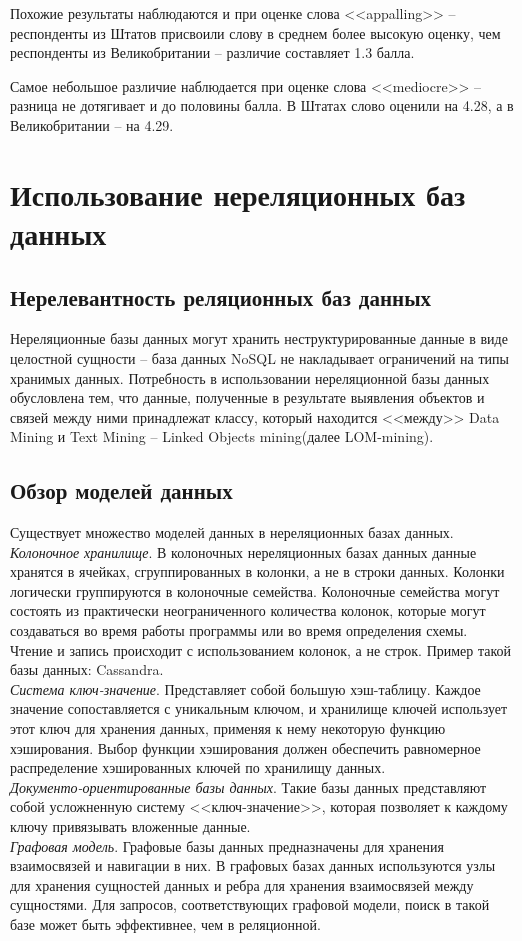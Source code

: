 Похожие результаты наблюдаются и при оценке слова <<appalling>> -- респонденты из Штатов присвоили слову в среднем более высокую оценку, чем респонденты из Великобритании -- различие составляет 1.3 балла.
 
Самое небольшое различие наблюдается при оценке слова <<mediocre>> -- разница не дотягивает и до половины балла. В Штатах слово оценили на 4.28, а в Великобритании -- на 4.29.
\section{Использование нереляционных баз данных}
\subsection{Нерелевантность реляционных баз данных}
Нереляционные базы данных могут хранить неструктурированные данные в виде целостной сущности -- база данных NoSQL не накладывает ограничений на типы хранимых данных. Потребность в использовании нереляционной базы данных обусловлена тем, что данные, полученные в результате выявления объектов и связей между ними принадлежат классу, который находится <<между>> Data Mining и Text Mining -- Linked Objects mining(далее LOM-mining). \cite{Попов2004}
\subsection{Обзор моделей данных}\label{subsec:store}
Существует множество моделей данных в нереляционных базах данных. \\
\textit{Колоночное хранилище}. В колоночных нереляционных базах данных данные хранятся в ячейках, сгруппированных в колонки, а не в строки данных. Колонки логически группируются в колоночные семейства. Колоночные семейства могут состоять из практически неограниченного количества колонок, которые могут создаваться во время работы программы или во время определения схемы. Чтение и запись происходит с использованием колонок, а не строк. Пример такой базы данных: Cassandra.\cite{cassandra}\\
\textit{Система ключ-значение}. Представляет собой большую хэш-таблицу. Каждое значение сопоставляется с уникальным ключом, и хранилище ключей использует этот ключ для хранения данных, применяя к нему некоторую функцию хэширования. Выбор функции хэширования должен обеспечить равномерное распределение хэшированных ключей по хранилищу данных. \cite{nosql} \\
\textit{Документо-ориентированные базы данных}. Такие базы данных представляют собой усложненную систему <<ключ-значение>>, которая позволяет к каждому ключу привязывать вложенные данные. \\
\textit{Графовая модель}. Графовые базы данных предназначены для хранения взаимосвязей и навигации в них. В графовых базах данных используются узлы для хранения сущностей данных и ребра для хранения взаимосвязей между сущностями. Для запросов, соответствующих графовой модели, поиск в такой базе может быть эффективнее, чем в реляционной. 


